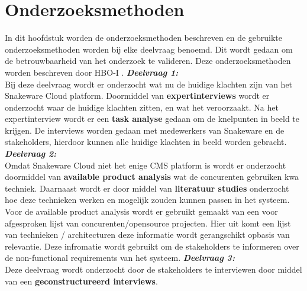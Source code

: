 \section{Onderzoeksmethoden}
In dit hoofdstuk worden de onderzoeksmethoden beschreven en de gebruikte onderzoeksmethoden worden bij elke deelvraag benoemd.
Dit wordt gedaan om de betrouwbaarheid van het onderzoek te valideren.
Deze onderzoeksmethoden worden beschreven door HBO-I \Parencite{HBO-i-reasearch-methods}.
\whitespace
\textit{\textbf{Deelvraag 1:} \SubquestionOne} \\
Bij deze deelvraag wordt er onderzocht wat nu de huidige klachten zijn van het Snakeware Cloud platform.
Doormiddel van \textbf{expertinterviews} wordt er onderzocht waar de huidige klachten zitten, en wat het veroorzaakt.
Na het expertinterview wordt er een \textbf{task analyse} gedaan om de knelpunten in beeld te krijgen.
De interviews worden gedaan met medewerkers van Snakeware en de stakeholders, hierdoor kunnen alle huidige klachten in beeld worden gebracht.
\whitespace
\textit{\textbf{Deelvraag 2:} \SubquestionTwo} \\
Omdat Snakeware Cloud niet het enige CMS platform is wordt er onderzocht doormiddel van \textbf{available product analysis} wat de concurenten gebruiken kwa techniek.
Daarnaast wordt er door middel van \textbf{literatuur studies} onderzocht hoe deze technieken werken en mogelijk zouden kunnen passen in het systeem.
Voor de available product analysis wordt er gebruikt gemaakt van een voor afgesproken lijst van concurenten/opensource projecten.
Hier uit komt een lijst van technieken / architecturen deze informatie wordt gerangschikt opbasis van relevantie.
Deze infromatie wordt gebruikt om de stakeholders te informeren over de non-functional requirements van het systeem.
\whitespace
\textit{\textbf{Deelvraag 3:} \SubquestionThree} \\
Deze deelvraag wordt onderzocht door de stakeholders te interviewen door middel van een \textbf{geconstructureerd interviews}. 
